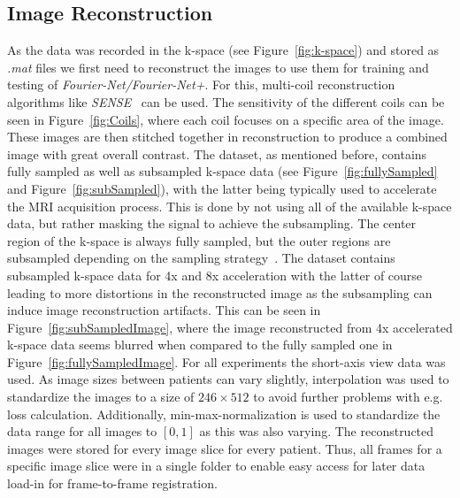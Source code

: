 \documentclass[english,version-2022-01]{uzl-thesis} %
\begin{document}
\subsection{Image Reconstruction} \label{SubSec:ImageReconstruction}
As the data was recorded in the k-space (see Figure~\ref{fig:k-space}) and stored as \emph{.mat} files we first need to reconstruct the images to use them for training and testing of \emph{Fourier-Net/Fourier-Net+}. For this, multi-coil reconstruction algorithms like \emph{SENSE}~\cite{SENSE1} can be used. The sensitivity of the different coils can be seen in Figure~\ref{fig:Coils}, where each coil focuses on a specific area of the image. These images are then stitched together in reconstruction to produce a combined image with great overall contrast.
The dataset, as mentioned before, contains fully sampled as well as subsampled k-space data (see Figure~\ref{fig:fullySampled} and Figure~\ref{fig:subSampled}), with the latter being typically used to accelerate the MRI acquisition process. This is done by not using all of the available k-space data, but rather masking the signal to achieve the subsampling. The center region of the k-space is always fully sampled, but the outer regions are subsampled depending on the sampling strategy~\cite{SubsamplingStrategies}. The dataset contains subsampled k-space data for 4x and 8x acceleration with the latter of course leading to more distortions in the reconstructed image as the subsampling can induce image reconstruction artifacts. This can be seen in Figure~\ref{fig:subSampledImage}, where the image reconstructed from 4x accelerated k-space data seems blurred when compared to the fully sampled one in Figure~\ref{fig:fullySampledImage}. 
For all experiments the short-axis  view data was used. As image sizes between patients can vary slightly, interpolation was used to standardize the images to a size of $246 \times 512$ to avoid further problems with e.g. 
loss calculation. Additionally, min-max-normalization is used to standardize the data range for all images to $[0,1]$ as this was also varying. The reconstructed images were stored for every image slice for every patient. Thus, all frames for a specific image slice were in a single folder to enable easy access for later data load-in for frame-to-frame registration.
\end{document}
